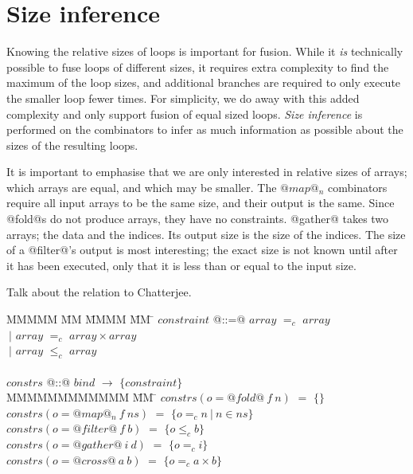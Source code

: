 \section{Size inference}
Knowing the relative sizes of loops is important for fusion.
While it \emph{is} technically possible to fuse loops of different sizes, it requires extra complexity to find the maximum of the loop sizes, and additional branches are required to only execute the smaller loop fewer times.
For simplicity, we do away with this added complexity and only support fusion of equal sized loops.
\emph{Size inference} is performed on the combinators to infer as much information as possible about the sizes of the resulting loops.

It is important to emphasise that we are only interested in relative sizes of arrays; which arrays are equal, and which may be smaller.
The $@map@_n$ combinators require all input arrays to be the same size, and their output is the same.
Since @fold@s do not produce arrays, they have no constraints.
@gather@ takes two arrays; the data and the indices. Its output size is the size of the indices.
The size of a @filter@'s output is most interesting; the exact size is not known until after it has been executed, only that it is less than or equal to the input size.

Talk about the relation to Chatterjee\cite{chatterjee1991size}.

\begin{tabbing}
MMMMM       \= MM \= MMMM \= MM \= \kill
$constraint$\> @::=@ \> $array$  \> $=_c$   \> $array$ \\
            \> $~|$  \> $array$  \> $=_c$   \> $array \times array$ \\
            \> $~|$  \> $array$  \> $\le_c$ \> $array$ \\
\\
$constrs$  \> @::@  \> $bind$  \> $\to$ \> $\{constraint\}$ \\
MMMMMMMMMMMM                 \= MM  \= \kill
$constrs(o = @fold@~f~n)  $ \> $=$ \> $\{\}$     \\
$constrs(o = @map@_n~f~ns)$ \> $=$ \> $\{o =_c n~|~n \in ns\}$     \\
$constrs(o = @filter@~f~b)$ \> $=$ \> $\{o \le_c b\}$              \\
$constrs(o = @gather@~i~d)$ \> $=$ \> $\{o =_c i\}$ \\
$constrs(o = @cross@~a~b) $ \> $=$ \> $\{o =_c a \times b\}$ \\
\end{tabbing}

